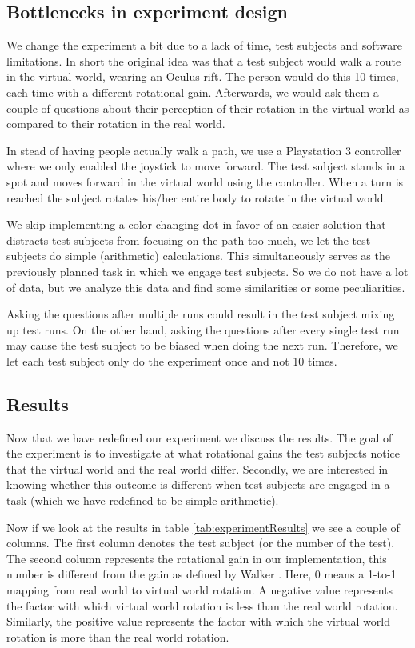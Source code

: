 \subsection{Bottlenecks in experiment design}
We change the experiment a bit due to a lack of time, test subjects and software limitations. 
In short the original idea was that a test subject would walk a route in the virtual world, wearing an Oculus rift. 
The person would do this 10 times, each time with a different rotational gain. 
Afterwards, we would ask them a couple of questions about their perception of their rotation in the virtual world as compared to their rotation in the real world. 

In stead of having people actually walk a path, we use a Playstation 3 controller where we only enabled the joystick to move forward. 
The test subject stands in a spot and moves forward in the virtual world using the controller. 
When a turn is reached the subject rotates his/her entire body to rotate in the virtual world. 

We skip implementing a color-changing dot in favor of an easier solution that distracts test subjects from focusing on the path too much, we let the test subjects do simple (arithmetic) calculations.
This simultaneously serves as the previously planned task in which we engage test subjects.
So we do not have a lot of data, but we analyze this data and find some similarities or some peculiarities.

Asking the questions after multiple runs could result in the test subject mixing up test runs.
On the other hand, asking the questions after every single test run may cause the test subject to be biased when doing the next run.
Therefore, we let each test subject only do the experiment once and not 10 times.

\subsection{Results}
Now that we have redefined our experiment we discuss the results.
The goal of the experiment is to investigate at what rotational gains the test subjects notice that the virtual world and the real world differ.
Secondly, we are interested in knowing whether this outcome is different when test subjects are engaged in a task (which we have redefined to be simple arithmetic).

Now if we look at the results in table \ref{tab:experimentResults} we see a couple of columns. 
The first column denotes the test subject (or the number of the test). 
The second column represents the rotational gain in our implementation, this number is different from the gain as defined by Walker \cite{jwalker}. 
Here, 0 means a 1-to-1 mapping from real world to virtual world rotation. 
A negative value represents the factor with which virtual world rotation is less than the real world rotation.
Similarly, the positive value represents the factor with which the virtual world rotation is more than the real world rotation.

